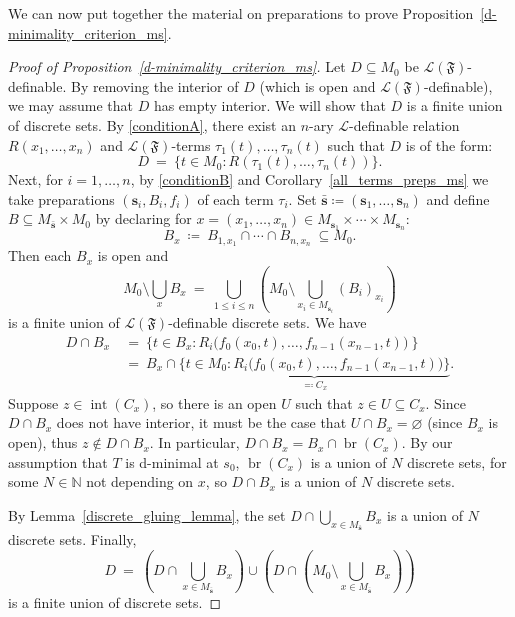 \documentclass[11pt]{amsart}
\theoremstyle{plain}
\theoremstyle{definition}
\numberwithin{equation}{section}
\newcommand{\fr}{\mathfrak}
\newcommand\N{\mathbb{N}}
\newcommand\calL{\mathcal{L}}
\newcommand\0{\varnothing}
\begin{document}
\noindent
We can now put together the material on preparations to prove Proposition~\ref{d-minimality_criterion_ms}. 

\begin{proof}[Proof of Proposition~\ref{d-minimality_criterion_ms}]
Let $D\subseteq M_0$ be $\calL(\fr{F})$-definable. By removing the interior of $D$ (which is open and $\calL(\fr{F})$-definable), we may assume that $D$ has empty interior. We will show that $D$ is a finite union of discrete sets. 
By \ref{conditionA}, there exist an $n$-ary $\calL$-definable relation $R(x_1,\ldots,x_n)$ and $\calL(\fr{F})$-terms $\tau_1(t),\ldots,\tau_n(t)$ such that $D$ is of the form:
\[
D \ = \ \{t\in M_0:R(\tau_1(t),\ldots,\tau_n(t))\}.
\]
Next, for $i=1,\ldots,n$, by \ref{conditionB} and Corollary~\ref{all_terms_preps_ms} we take preparations $(\bm{s}_{i},B_{i},f_{i})$ of each term $\tau_{i}$. Set $\bar{\bm{s}}\coloneqq (\bm{s}_1,\ldots,\bm{s}_n)$ and define  $B\subseteq M_{\bar{\bm{s}}}\times M_0$ by declaring for $x=(x_1,\ldots,x_n) \in M_{\bm{s}_1}\times \cdots \times M_{\bm{s}_n}$: 
\[
B_x \ \coloneqq  \ B_{1,x_1}\cap\cdots\cap B_{n,x_n}\ \subseteq M_0.
\]
Then each $B_x$ is open and 
\[
\textstyle M_0\setminus\bigcup_{x}B_x \ = \ \bigcup_{1\leq i\leq n} (M_0 \setminus \bigcup_{x_{i}\in M_{\bm{s}_i}}(B_{i})_{x_{i}})
\]
is a finite union of $\calL(\fr{F})$-definable discrete sets.
We have 
\begin{align*}
D \cap B_x\ &= \ \{ t \in B_x : R_{i}\big(f_{0}(x_{0},t),\dots,f_{n-1}(x_{n-1},t)\big)\ \} \\
&= \ B_x\cap 
\underbrace{\{ t \in M_0 : R_{i}\big(f_{0}(x_{0},t),\dots,f_{n-1}(x_{n-1},t)\big) \}}_{\eqqcolon C_x}.
\end{align*}
Suppose $z\in\operatorname{int}(C_x)$, so there is an open $U$ such that $z\in U\subseteq C_x$. Since $D\cap B_x$ does not have interior, it must be the case that $U\cap B_x=\varnothing$ (since $B_x$ is open), thus $z\not\in D\cap B_x$. In particular, $D\cap B_x=B_x\cap \operatorname{br}(C_x)$. By our assumption that $T$ is d-minimal at $s_0$, $\operatorname{br}(C_x)$ is a union of $N$ discrete sets, for some $N \in \N$ not depending on $x$, so $D \cap B_x$ is a union of $N$ discrete sets. 

By Lemma~\ref{discrete_gluing_lemma}, the set $D \cap \bigcup_{x \in M_{\bar{\bm{s}}}} B_x$ is a union of $N$ discrete sets.
Finally,
\[
\textstyle D\ =\ (D \cap \bigcup_{x \in M_{\bar{\bm{s}}}} B_x) \cup (D \cap (M_0 \setminus \bigcup_{x \in M_{\bar{\bm{s}}}} B_x))
\]
is a finite union of discrete sets.
\end{proof}
\end{document}
